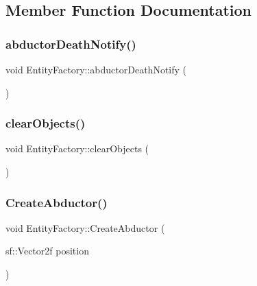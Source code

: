 \subsection{Member Function Documentation}
\hypertarget{class_entity_factory_ad55d3285456e3d8e03d27d274ac60d00}{}\label{class_entity_factory_ad55d3285456e3d8e03d27d274ac60d00} 
\subsubsection{\texorpdfstring{abductor\+Death\+Notify()}{abductorDeathNotify()}}
{\footnotesize\ttfamily void Entity\+Factory\+::abductor\+Death\+Notify (\begin{DoxyParamCaption}{ }\end{DoxyParamCaption})\hspace{0.3cm}{\ttfamily [static]}}

\hypertarget{class_entity_factory_a242fb009eda7ff8ff51025fd3d6a1e23}{}\label{class_entity_factory_a242fb009eda7ff8ff51025fd3d6a1e23} 
\subsubsection{\texorpdfstring{clear\+Objects()}{clearObjects()}}
{\footnotesize\ttfamily void Entity\+Factory\+::clear\+Objects (\begin{DoxyParamCaption}{ }\end{DoxyParamCaption})\hspace{0.3cm}{\ttfamily [static]}}

\hypertarget{class_entity_factory_a900ad8e29d0d8f27e6b4c981f25a7a58}{}\label{class_entity_factory_a900ad8e29d0d8f27e6b4c981f25a7a58} 
\subsubsection{\texorpdfstring{Create\+Abductor()}{CreateAbductor()}}
{\footnotesize\ttfamily void Entity\+Factory\+::\+Create\+Abductor (\begin{DoxyParamCaption}\item[{sf\+::\+Vector2f}]{position }\end{DoxyParamCaption})\hspace{0.3cm}{\ttfamily [static]}}


